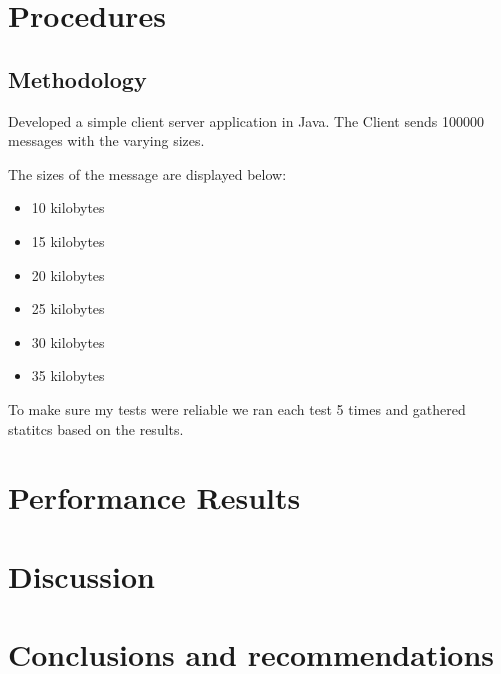 \documentclass{article}
\begin{document}
\section{Procedures}

\subsection{Methodology}
Developed a simple client server application in Java. The Client sends 100000 messages with the varying sizes. 

The sizes of the message are displayed below: 
\begin{itemize}
	\item 10 kilobytes
	\item 15 kilobytes
	\item 20 kilobytes
	\item 25 kilobytes
	\item 30 kilobytes
	\item 35 kilobytes
\end{itemize}

To make sure my tests were reliable we ran each test 5 times and gathered statitcs based on the results.




\section{Performance Results}






\section{Discussion}



\section{Conclusions and recommendations}
\end{document}
